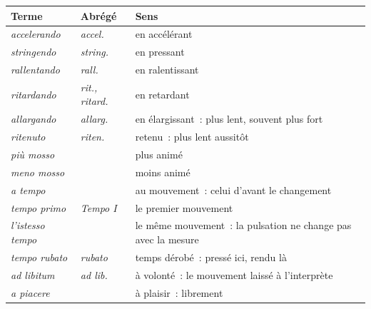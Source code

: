 \begin{tabular}{@{}l l l@{}}
\toprule
\textbf{Terme} & \textbf{Abrégé} & \textbf{Sens} \\
\midrule
\emph{accelerando} & \emph{accel.} & en accélérant \\
\emph{stringendo} & \emph{string.} & en pressant \\
\emph{rallentando} & \emph{rall.} & en ralentissant \\
\emph{ritardando} & \emph{rit., ritard.} & en retardant \\
\emph{allargando} & \emph{allarg.} & en élargissant~: plus lent, souvent plus fort \\
\emph{ritenuto} & \emph{riten.} & retenu~: plus lent aussitôt \\
\emph{più mosso} &  & plus animé \\
\emph{meno mosso} &  & moins animé \\
\emph{a tempo} &  & au mouvement~: celui d'avant le changement \\
\emph{tempo primo} & \emph{Tempo I} & le premier mouvement \\
\emph{l'istesso tempo} &  & le même mouvement~: la pulsation ne change pas avec la mesure \\
\emph{tempo rubato} & \emph{rubato} & temps dérobé~: pressé ici, rendu là \\
\emph{ad libitum} & \emph{ad lib.} & à volonté~: le mouvement laissé à l'interprète \\
\emph{a piacere} &  & à plaisir~: librement \\
\bottomrule
\end{tabular}
